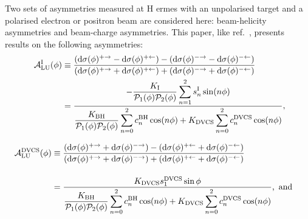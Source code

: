 Two sets of asymmetries measured at H{\sc
ermes} with an unpolarised target and a polarised electron or positron
beam are considered here:
beam-helicity asymmetries and beam-charge asymmetries. This paper, like ref.~\cite{Air09}, presents results on the following asymmetries:
\begin{align}
\hspace{0.5cm}\mathcal{A}^{\textrm{I}}_{\textrm{LU}}(\phi) &\equiv
\frac{(\textrm{d}\sigma(\phi)^{+\rightarrow} -
\textrm{d}\sigma(\phi)^{+\leftarrow}) -
(\textrm{d}\sigma(\phi)^{-\rightarrow}
- \textrm{d}\sigma(\phi)^{-\leftarrow})}{(\textrm{d}\sigma(\phi)^{+\rightarrow}
+
\textrm{d}\sigma(\phi)^{+\leftarrow}) +
(\textrm{d}\sigma(\phi)^{-\rightarrow}
+ \textrm{d}\sigma(\phi)^{-\leftarrow})}&  \nonumber \\
&=\dfrac{-\dfrac{K_{\textrm{I}}}{\mathcal{P}_{1}(\phi)\mathcal{P}_{2}(\phi)}
\displaystyle\sum_{n=1}^2
s_{n}^{\textrm{I}}\sin(n\phi)}{\dfrac{K_{\textrm{BH}}}{\mathcal{P}_{1}
(\phi)\mathcal{P}_{
2}(\phi)}
\displaystyle\sum_{n=0}^2
c_{n}^{\textrm{BH}}\cos(n\phi) + 
K_{\textrm{DVCS}}\displaystyle\sum_{n=0}^2 c_{n}^{\textrm{DVCS}}\cos(n\phi)},& 
\label{e:alui}
\end{align}

\begin{align}
\mathcal{A}^{\textrm{DVCS}}_{\textrm{LU}}(\phi) &\equiv
\frac{(\textrm{d}\sigma(\phi)^{+\rightarrow} +
\textrm{d}\sigma(\phi)^{-\rightarrow}) -
(\textrm{d}\sigma(\phi)^{+\leftarrow} + 
\textrm{d}\sigma(\phi)^{-\leftarrow})}
{(\textrm{d}\sigma(\phi)^{+\rightarrow} +
\textrm{d}\sigma(\phi)^{-\rightarrow}) +
(\textrm{d}\sigma(\phi)^{+\leftarrow}
+ \textrm{d}\sigma(\phi)^{-\leftarrow})}& \nonumber \\[0.4cm]
&=\dfrac{ K_{\textrm{DVCS}} s_{1}^{\textrm{DVCS}}\sin\phi}{\dfrac{K_{\textrm{BH}}}{\mathcal{P}_{1}
(\phi)\mathcal{P}_{2}(\phi)}
\displaystyle\sum_{n=0}^2
c_{n}^{\textrm{BH}}\cos(n\phi) + 
K_{\textrm{DVCS}}\displaystyle\sum_{n=0}^2
c_{n}^{\textrm{DVCS}}\cos(n\phi)} \textrm{,\, and}&
\label{e:aludvcs}
\end{align}

